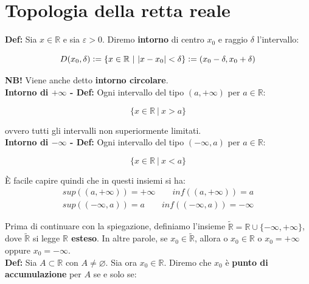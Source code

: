 \documentclass{article}
\begin{document}
\section{Topologia della retta reale}
\textbf{Def:} Sia $x \in \mathbb{R}$ e sia $\varepsilon > 0$. Diremo \textbf{intorno} di centro $x_0$ e raggio $\delta$ l'intervallo: 

\begin{equation*}
    D(x_0, \delta) \vcentcolon = \{x\in\mathbb{R} \ | \ |x - x_0| < \delta\} \vcentcolon = (x_0 - \delta, x_0 + \delta)
\end{equation*}

\noindent\textbf{NB!} Viene anche detto \textbf{intorno circolare}.\\

\noindent\textbf{Intorno di $+\infty$ - Def:}  Ogni intervallo del tipo $(a, + \infty)$ per $a \in \mathbb{R}$:

\begin{equation*}
    \{x\in\mathbb{R} \ | \ x > a\}
\end{equation*}

\noindent ovvero tutti gli intervalli non superiormente limitati.\\

\noindent\textbf{Intorno di $-\infty$ - Def:}  Ogni intervallo del tipo $(- \infty, a)$ per $a \in \mathbb{R}$:

\begin{equation*}
    \{x\in\mathbb{R} \ | \ x < a\}
\end{equation*}

\noindent È facile capire quindi che in questi insiemi si ha:
\begin{gather*}
    sup((a, +\infty)) = +\infty \qquad inf((a, +\infty)) = a \\
    sup((-\infty, a)) = a \qquad inf((-\infty, a)) = - \infty
\end{gather*}

\noindent Prima di continuare con la spiegazione, definiamo l'insieme $\widetilde{\mathbb{R}} = \mathbb{R} \cup \{-\infty, +\infty\}$, dove $\widetilde{\mathbb{R}}$ si legge \textbf{$\mathbb{R}$ esteso}. In altre parole, se $x_0 \in \widetilde{\mathbb{R}}$, allora o $x_0 \in \mathbb{R}$ o $x_0 = +\infty$ oppure $x_0 = - \infty$.\\

\noindent \textbf{Def:} Sia $A \subset \mathbb{R}$ con $A \neq \varnothing$. Sia ora $x_0 \in \mathbb{R}$. Diremo che $x_0$ è \textbf{punto di accumulazione} per $A$ se e solo se:
\end{document}

